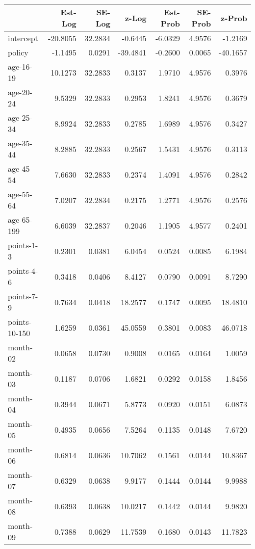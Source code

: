 \documentclass[10pt]{article}
\begin{document}
\begin{table}[ht]
\centering
\begin{tabular}{lrrrrrr}
  \hline
 & Est-Log & SE-Log & z-Log & Est-Prob & SE-Prob & z-Prob \\ 
  \hline
intercept & -20.8055 & 32.2834 & -0.6445 & -6.0329 & 4.9576 & -1.2169 \\ 
  policy & -1.1495 & 0.0291 & -39.4841 & -0.2600 & 0.0065 & -40.1657 \\ 
  age-16-19 & 10.1273 & 32.2833 & 0.3137 & 1.9710 & 4.9576 & 0.3976 \\ 
  age-20-24 & 9.5329 & 32.2833 & 0.2953 & 1.8241 & 4.9576 & 0.3679 \\ 
  age-25-34 & 8.9924 & 32.2833 & 0.2785 & 1.6989 & 4.9576 & 0.3427 \\ 
  age-35-44 & 8.2885 & 32.2833 & 0.2567 & 1.5431 & 4.9576 & 0.3113 \\ 
  age-45-54 & 7.6630 & 32.2833 & 0.2374 & 1.4091 & 4.9576 & 0.2842 \\ 
  age-55-64 & 7.0207 & 32.2834 & 0.2175 & 1.2771 & 4.9576 & 0.2576 \\ 
  age-65-199 & 6.6039 & 32.2837 & 0.2046 & 1.1905 & 4.9577 & 0.2401 \\ 
  points-1-3 & 0.2301 & 0.0381 & 6.0454 & 0.0524 & 0.0085 & 6.1984 \\ 
  points-4-6 & 0.3418 & 0.0406 & 8.4127 & 0.0790 & 0.0091 & 8.7290 \\ 
  points-7-9 & 0.7634 & 0.0418 & 18.2577 & 0.1747 & 0.0095 & 18.4810 \\ 
  points-10-150 & 1.6259 & 0.0361 & 45.0559 & 0.3801 & 0.0083 & 46.0718 \\ 
  month-02 & 0.0658 & 0.0730 & 0.9008 & 0.0165 & 0.0164 & 1.0059 \\ 
  month-03 & 0.1187 & 0.0706 & 1.6821 & 0.0292 & 0.0158 & 1.8456 \\ 
  month-04 & 0.3944 & 0.0671 & 5.8773 & 0.0920 & 0.0151 & 6.0873 \\ 
  month-05 & 0.4935 & 0.0656 & 7.5264 & 0.1135 & 0.0148 & 7.6720 \\ 
  month-06 & 0.6814 & 0.0636 & 10.7062 & 0.1561 & 0.0144 & 10.8367 \\ 
  month-07 & 0.6329 & 0.0638 & 9.9177 & 0.1444 & 0.0144 & 9.9988 \\ 
  month-08 & 0.6393 & 0.0638 & 10.0217 & 0.1442 & 0.0144 & 9.9820 \\ 
  month-09 & 0.7388 & 0.0629 & 11.7539 & 0.1680 & 0.0143 & 11.7823 \\ 

\end{tabular}
\end{table}
\end{document}
